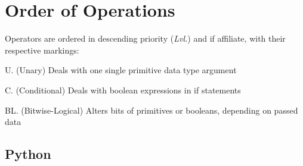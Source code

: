 \documentclass{article}
\begin{document}
\setlength{\tabcolsep}{1pt}
\renewcommand{\arraystretch}{1}
\section{Order of Operations} 
Operators are ordered in descending priority (\textit{Lvl.}) and if affiliate, with their respective markings:

U. (Unary) \dotfill Deals with one single primitive data type argument

C. (Conditional) \dotfill Deals with boolean expressions in if statements

BL. (Bitwise-Logical) \dotfill Alters bits of primitives or booleans, depending on passed data

\subsection{Python} %
\end{document}
